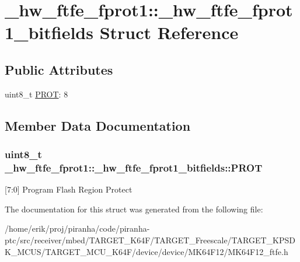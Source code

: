 \hypertarget{struct__hw__ftfe__fprot1_1_1__hw__ftfe__fprot1__bitfields}{}\section{\+\_\+hw\+\_\+ftfe\+\_\+fprot1\+:\+:\+\_\+hw\+\_\+ftfe\+\_\+fprot1\+\_\+bitfields Struct Reference}
\label{struct__hw__ftfe__fprot1_1_1__hw__ftfe__fprot1__bitfields}
\subsection*{Public Attributes}
\begin{DoxyCompactItemize}
\item 
uint8\+\_\+t \hyperlink{struct__hw__ftfe__fprot1_1_1__hw__ftfe__fprot1__bitfields_aa2206895c476b88b84e9bfcffeb41236}{P\+R\+OT}\+: 8
\end{DoxyCompactItemize}


\subsection{Member Data Documentation}
\subsubsection[{\texorpdfstring{P\+R\+OT}{PROT}}]{\setlength{\rightskip}{0pt plus 5cm}uint8\+\_\+t \+\_\+hw\+\_\+ftfe\+\_\+fprot1\+::\+\_\+hw\+\_\+ftfe\+\_\+fprot1\+\_\+bitfields\+::\+P\+R\+OT}\hypertarget{struct__hw__ftfe__fprot1_1_1__hw__ftfe__fprot1__bitfields_aa2206895c476b88b84e9bfcffeb41236}{}\label{struct__hw__ftfe__fprot1_1_1__hw__ftfe__fprot1__bitfields_aa2206895c476b88b84e9bfcffeb41236}
\mbox{[}7\+:0\mbox{]} Program Flash Region Protect 

The documentation for this struct was generated from the following file\+:\begin{DoxyCompactItemize}
\item 
/home/erik/proj/piranha/code/piranha-\/ptc/src/receiver/mbed/\+T\+A\+R\+G\+E\+T\+\_\+\+K64\+F/\+T\+A\+R\+G\+E\+T\+\_\+\+Freescale/\+T\+A\+R\+G\+E\+T\+\_\+\+K\+P\+S\+D\+K\+\_\+\+M\+C\+U\+S/\+T\+A\+R\+G\+E\+T\+\_\+\+M\+C\+U\+\_\+\+K64\+F/device/device/\+M\+K64\+F12/M\+K64\+F12\+\_\+ftfe.\+h\end{DoxyCompactItemize}
